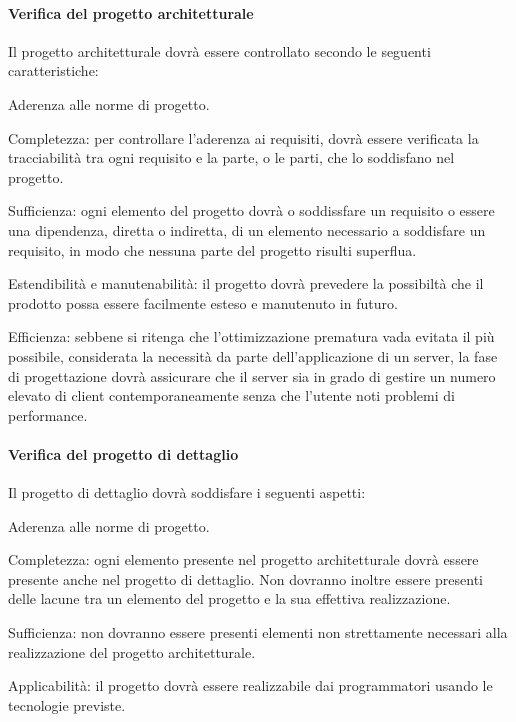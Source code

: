 \paragraph{Verifica del progetto architetturale}
Il progetto architetturale dovr\`a essere controllato secondo le seguenti caratteristiche:
\begin{elenconumerato}[\textbf{}]{\subsubsecindent}
\item Aderenza alle norme di progetto.
\item Completezza: per controllare l'aderenza ai requisiti, dovr\`a essere verificata la tracciabilit\`a tra ogni requisito e la parte, o le parti, che lo soddisfano nel progetto.
\item Sufficienza: ogni elemento del progetto dovr\`a o soddissfare un requisito o essere una dipendenza, diretta o indiretta, di un elemento necessario a soddisfare un requisito, in modo che nessuna parte del progetto risulti superflua.
\item Estendibilit\`a e manutenabilit\`a: il progetto dovr\`a prevedere la possibilt\`a che il prodotto possa essere facilmente esteso e manutenuto in futuro.
\item Efficienza: sebbene si ritenga che l'ottimizzazione prematura vada evitata il pi\`u possibile, considerata la necessit\`a da parte dell'applicazione di un server, la fase di progettazione dovr\`a assicurare che il server sia in grado di gestire un numero elevato di client contemporaneamente senza che l'utente noti problemi di performance.
\end{elenconumerato}
\paragraph{Verifica del progetto di dettaglio}
Il progetto di dettaglio dovr\`a soddisfare i seguenti aspetti:
\begin{elenconumerato}[\textbf{}]{\subsubsecindent}
\item Aderenza alle norme di progetto.
\item Completezza: ogni elemento presente nel progetto architetturale dovr\`a essere presente anche nel progetto di dettaglio. Non dovranno inoltre essere presenti delle lacune tra un elemento del progetto e la sua effettiva realizzazione.
\item Sufficienza: non dovranno essere presenti elementi non strettamente necessari alla realizzazione del progetto architetturale.
\item Applicabilit\`a: il progetto dovr\`a essere realizzabile dai programmatori usando le tecnologie previste.
\end{elenconumerato}
